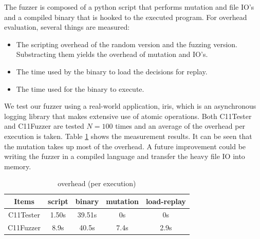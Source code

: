 The fuzzer is composed of a python script that performs mutation and file IO's and a compiled binary that is hooked to the executed program. For overhead evaluation, several things are measured:
\begin{itemize}
	\item The scripting overhead of the random version and the fuzzing version. Substracting them yields the overhead of mutation and IO's.
	\item The time used by the binary to load the decisions for replay.
	\item The time used for the binary to execute.
\end{itemize}

We test our fuzzer using a real-world application, iris, which is an asynchronous logging library that makes extensive use of atomic operations. Both C11Tester and C11Fuzzer are tested $N=100$ times and an average of the overhead per execution is taken. Table \ref{overhead} shows the measurement results. It can be seen that the mutation takes up most of the overhead. A future improvement could be writing the fuzzer in a compiled language and transfer the heavy file IO into memory.

\begin{table}[h!]
	\centering
	\begin{tabular}{ |c|cccc| }
		\hline
		Items     & script & binary & mutation & load-replay \\
		\hline
		C11Tester & 1.50s  & 39.51s & 0s       & 0s          \\
		C11Fuzzer & 8.9s   & 40.5s  & 7.4s     & 2.9s        \\
		\hline
	\end{tabular}
	\caption{overhead (per execution)}
	\label{overhead}
\end{table}


